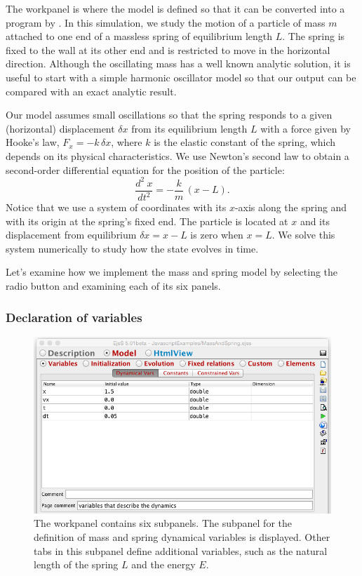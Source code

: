 The  workpanel is where the model is defined so that it can be converted into a program by \ejs. In this simulation,
we study the motion of a particle of mass $m$ attached to one end of a massless spring of equilibrium length $L$.
The spring is fixed to the wall at its other end and is restricted to move in the horizontal direction. Although the
oscillating mass has a well known analytic solution, it is useful to start with a simple harmonic oscillator model so that
our output can be compared with an exact analytic result.

Our model assumes small oscillations so that the spring responds to a given (horizontal) displacement $\delta x$ from
its equilibrium length $L$ with a force given by Hooke's law, $F_x = - k \,\delta x$, where $k$ is
the elastic constant of the spring, which depends on its physical characteristics. We use Newton's second
law to obtain a second-order differential equation for the position of the particle:
\begin{equation}
  \frac{d^2\ x}{dt^2} = -\frac{k}{m}\,(x-L). \label{eq:03ExplorationJavascript/SpringBasic}
\end{equation}
Notice that we use a system of coordinates with its $x$-axis along the spring and with its origin at the
spring's fixed end. The particle is located at $x$ and its displacement from equilibrium $\delta x=x-L$ is zero when $x=L$. We solve this system numerically to study how the state evolves in time.

Let's examine how we implement the mass and spring model by selecting the  radio button and examining each of
its six panels.

\subsubsection{Declaration of variables}
\begin{figure}[htb]
    \centering
  \includegraphics[scale=\scale]{03ExplorationJavascript/images/ModelVariables.png}
    \caption{The  workpanel contains six subpanels. The subpanel for the definition of mass and spring dynamical variables is displayed.  Other tabs in this subpanel define additional variables, such as the natural length of the spring $L$ and the energy $E$.} \label{fig:03ExplorationJavascript/ModelVariables}
\end{figure}

